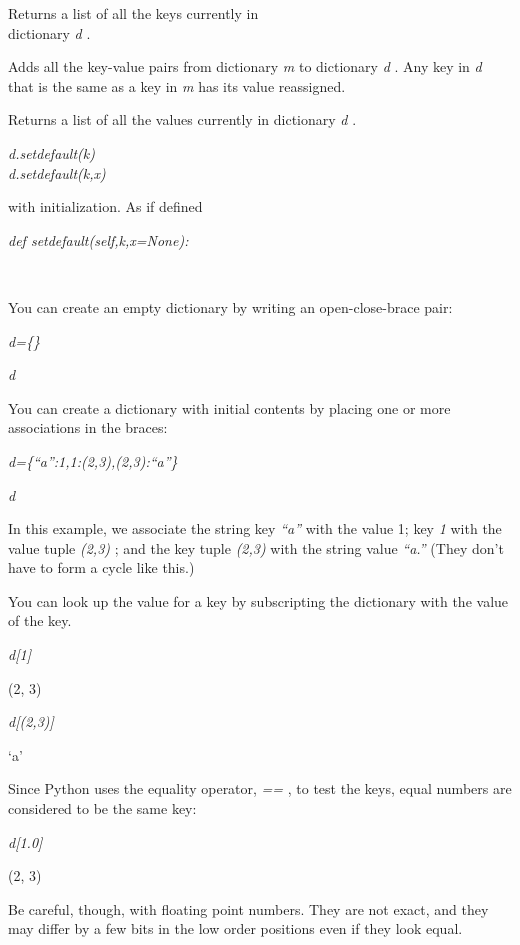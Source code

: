 Returns a list of all the keys
currently in\\
dictionary \emph{d} .



Adds all the key-value pairs from
dictionary \emph{m} to dictionary \emph{d} . Any key in \emph{d} that is
the same as a key in \emph{m} has its value reassigned.



Returns a list of all the values
currently in dictionary \emph{d} .

 \emph{d.setdefault(k)\\
d.setdefault(k,x)}


with initialization. As if defined

 \emph{def
setdefault(self,k,x=None):}











~

You can create an empty dictionary
by writing an open-close-brace pair:


\emph{d=\{\}}


\emph{d}



You can create a dictionary with
initial contents by placing one or more associations in the braces:


\emph{d=\{``a'':1,1:(2,3),(2,3):``a''\}}


\emph{d}



In this example, we associate the
string key \emph{``a''} with the value 1; key \emph{1} with the value
tuple \emph{(2,3)} ; and the key tuple \emph{(2,3)} with the string
value \emph{``a.''} (They don't have to form a cycle like this.)

You can look up the value for a key
by subscripting the dictionary with the value of the key.


\emph{d{[}1{]}}

(2, 3)


\emph{d{[}(2,3){]}}

`a'

Since Python uses the equality
operator, \emph{==} , to test the keys, equal numbers are considered to
be the same key:


\emph{d{[}1.0{]}}

(2, 3)

Be careful, though, with floating
point numbers. They are not exact, and they may differ by a few bits in
the low order positions even if they look equal.

